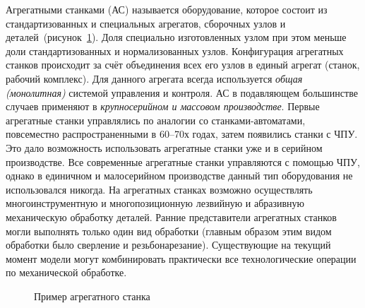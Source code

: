 Агрегатными станками (АС) называется оборудование, которое состоит из стандартизованных и специальных агрегатов, сборочных узлов и деталей~(рисунок~\cref{fig:agr-example}). Доля специально изготовленных узлом при этом меньше доли стандартизованных и нормализованных узлов. Конфигурация агрегатных станков происходит за счёт объединения всех его узлов в единый агрегат (станок, рабочий комплекс). Для данного агрегата всегда используется \textit{общая (монолитная)} системой управления и контроля. АС в подавляющем большинстве случаев применяют в \textit{крупносерийном и массовом производстве}. Первые агрегатные станки управлялись по аналогии со станками-автоматами, повсеместно распространенными в 60--70х годах, затем появились станки с ЧПУ. Это дало возможность использовать агрегатные станки уже и в серийном производстве. Все современные агрегатные станки управляются с помощью ЧПУ, однако в единичном и малосерийном производстве данный тип оборудования не использовался никогда. На агрегатных станках возможно осуществлять многоинструментную и многопозиционную лезвийную и абразивную механическую обработку деталей. Ранние представители агрегатных станков могли выполнять только один вид обработки (главным образом этим видом обработки было сверление и резьбонарезание). Существующие на текущий момент модели могут комбинировать практически все технологические операции по механической обработке.

\begin{figure}[ht]
	\caption{Пример агрегатного станка}\label{fig:agr-example}
\end{figure}

